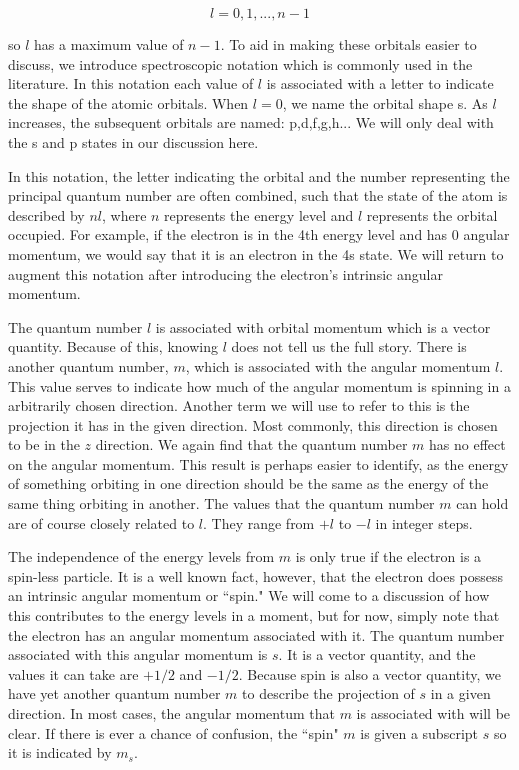 \documentclass[12pt]{article}
\begin{document}
		\begin{equation}
			l=0,1,...,n-1
		\end{equation}

		so $l$ has a maximum value of $n-1$. To aid in making
		these orbitals easier to discuss, we introduce 
		spectroscopic notation which is commonly used in the 
		literature. In this notation
		each value of $l$ is associated with a letter to indicate
		the shape of the atomic orbitals. When $l=0$, we name the 
		orbital shape s. As $l$ increases, the subsequent orbitals
		are named: p,d,f,g,h... We will only deal with the s and p 
		states in our discussion here. 

		In this notation, the letter indicating the orbital 
		and the number representing the principal quantum number 
		are often combined, such that the state of the atom 
		is described by $nl$, where $n$
		represents the energy level and $l$ represents the orbital
		occupied. For example, if the electron is in the 4th energy
		level and has 0 angular momentum, we would say that it is
		an electron in the 4s state. We will return to augment this 
		notation after introducing the electron's intrinsic angular
		momentum.

		The quantum number $l$ is associated with orbital momentum 
		which is a vector quantity. Because of this, knowing $l$
		does not tell us the full story. 
		There is another quantum number, $m$, which is associated 
		with the angular momentum $l$. This value serves to indicate
		how much of the angular momentum is spinning in a arbitrarily
		chosen direction. Another term we will use to refer to this
		is the projection it has in the given direction.
		Most commonly, this direction is chosen
		to be in the $z$ direction. We again find that the quantum
        number $m$ has no effect on the angular momentum. This result
        is perhaps easier to identify, as the energy of something 
        orbiting in one direction should be the same as the energy 
        of the same thing orbiting in another. The values that the 
		quantum number $m$ can hold are of course
		closely related to $l$. They range from $+l$ to $-l$ in
		integer steps. 

        The independence of the energy levels from $m$ is only true
        if the electron is a spin-less particle. It is a well known
        fact, however, that the electron does possess an intrinsic 
        angular momentum or ``spin." We will come to a discussion of 
        how this contributes to the energy levels in a moment, but 
        for now, simply note that the electron has an angular 
        momentum associated with it. The quantum number associated
        with this angular momentum is $s$. It is a vector 
		quantity, and the values it can take are $+1/2$ and $-1/2$.
		Because spin is also a vector quantity, we have 
		yet another quantum number $m$ to describe the projection 
		of $s$ in a given direction. In most cases, the angular
		momentum that $m$ is associated with will be clear. If
		there is ever a chance of confusion, the ``spin" $m$ is
		given a subscript $s$ so it is indicated by $m_s$.
\end{document}
